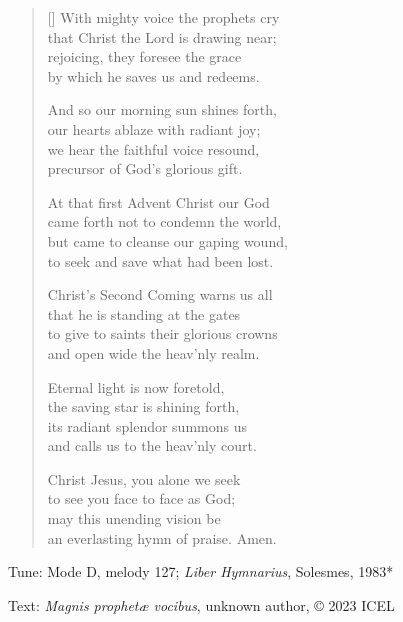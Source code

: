 \hymn

\settowidth{\versewidth}{to give to saints their glorious crowns}

\begin{verse}[\versewidth]
With mighty voice the prophets cry\\
that Christ the Lord is drawing near;\\
rejoicing, they foresee the grace\\
by which he saves us and redeems.

And so our morning sun shines forth,\\
our hearts ablaze with radiant joy;\\
we hear the faithful voice resound,\\
precursor of God’s glorious gift.

At that first Advent Christ our God\\
came forth not to condemn the world,\\
but came to cleanse our gaping wound,\\
to seek and save what had been lost.

Christ’s Second Coming warns us all\\
that he is standing at the gates\\
to give to saints their glorious crowns\\
and open wide the heav’nly realm.

Eternal light is now foretold,\\
the saving star is shining forth,\\
its radiant splendor summons us\\
and calls us to the heav’nly court.

Christ Jesus, you alone we seek\\
to see you face to face as God;\\
may this unending vision be\\
an everlasting hymn of praise. Amen.
\end{verse}

\begin{hymnsource}
Tune: Mode D, melody 127; \emph{Liber Hymnarius}, Solesmes, 1983*

Text: \emph{Magnis prophetæ vocibus}, unknown author, © 2023 ICEL
\end{hymnsource}